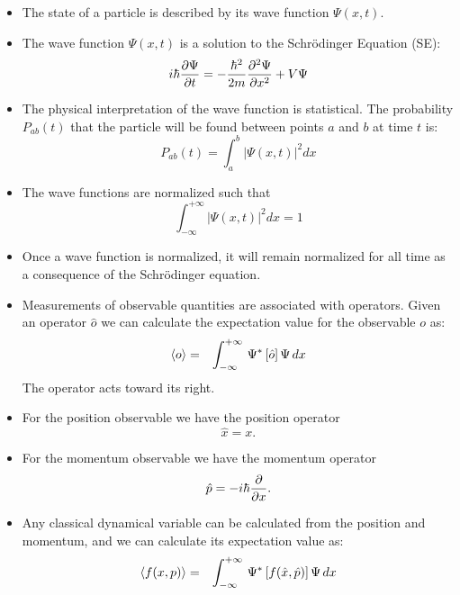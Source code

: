 \documentclass[12pt]{article}
\begin{document}
\begin{itemize}
\item The state of a particle is described by its wave function $\Psi(x,t)$.
\item The wave function $\Psi(x,t)$ is a solution to the Schr\"odinger Equation (SE):
\begin{equation}
\label{eqn:se}
i \hbar  \frac{\partial \Psi}{\partial t}  = - \frac{\hbar^2}{2 m} \frac{\partial^2 \Psi}{\partial x^2}  + V \Psi
\end{equation}
\item The physical interpretation of the wave function is statistical.  The probability $P_{ab}(t)$ that the particle will be found between points $a$ and $b$ at time $t$ is:
\begin{equation}
\label{eqn:prob}
P_{ab}(t) = \int_a^b |\Psi(x,t)|^2 dx
\end{equation}
\item The wave functions are normalized such that
\begin{equation}
\int_{-\infty}^{+\infty} |\Psi(x,t)|^2 dx = 1
\end{equation}
\item Once a wave function is normalized, it will remain normalized for all time as a consequence of the Schr\"odinger equation.
\item Measurements of observable quantities are associated with operators.  Given an operator $\hat{o}$ we can calculate the expectation value for the observable $o$ as:
\begin{eqnarray}
\braket{o}  &=& \int_{-\infty}^{+\infty} \, \Psi^* \left[ \hat{o} \right] \Psi \,dx 
\end{eqnarray}
The operator acts toward its right.
\item For the position observable we have the position operator 
\begin{equation}
\hat{x} = x.
\end{equation}
\item For the momentum observable we have the momentum operator 
\begin{equation}
\hat{p} = - i \hbar \frac{\partial}{\partial x}.
\end{equation}
\item Any classical dynamical variable can be calculated from the position and momentum, and we can calculate its expectation value as:
\begin{eqnarray}
\braket{f(x,p)}  &=& \int_{-\infty}^{+\infty} \, \Psi^* \left[ f(\hat{x},\hat{p}) \right] \Psi \,dx 
\end{eqnarray}

\end{itemize}
\end{document}

